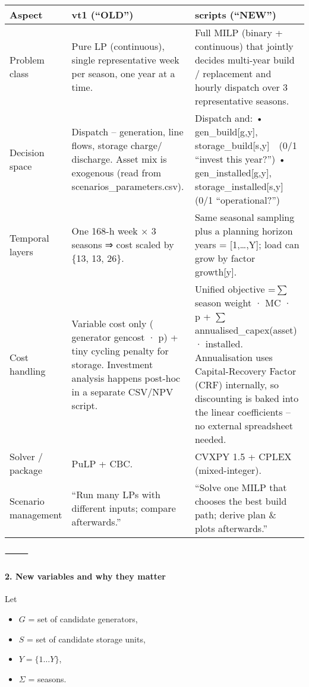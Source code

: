\begin{center}
\begin{tabular}{|l|l|l|}
\hline
Aspect & vt1 (“OLD”) & scripts (“NEW”) \\
\hline
Problem class & Pure LP (continuous), single representative week per season, one year at a time. & Full MILP (binary + continuous) that jointly decides multi-year build / replacement and hourly dispatch over 3 representative seasons. \\
Decision space & Dispatch – generation, line flows, storage charge/ discharge. Asset mix is exogenous (read from scenarios\_parameters.csv). & Dispatch and: • gen\_build[g,y], storage\_build[s,y] (0/1 “invest this year?”) • gen\_installed[g,y], storage\_installed[s,y] (0/1 “operational?”) \\
Temporal layers & One 168-h week × 3 seasons ⇒ cost scaled by \{13, 13, 26\}. & Same seasonal sampling plus a planning horizon years = [1,…,Y]; load can grow by factor growth[y]. \\
Cost handling & Variable cost only ( generator gencost · p) + tiny cycling penalty for storage. Investment analysis happens post-hoc in a separate CSV/NPV script. & Unified objective =$\sum$ season weight · MC · p  +  $\sum$ annualised\_capex(asset) · installed.  Annualisation uses Capital-Recovery Factor (CRF) internally, so discounting is baked into the linear coefficients – no external spreadsheet needed. \\
Solver / package & PuLP + CBC. & CVXPY 1.5 + CPLEX (mixed-integer). \\
Scenario management & “Run many LPs with different inputs; compare afterwards.” & “Solve one MILP that chooses the best build path; derive plan \& plots afterwards.” \\
\hline
\end{tabular}
\end{center}

⸻

\paragraph{2. New variables and why they matter}

Let
\begin{itemize}
    \item $G$ = set of candidate generators,
    \item $S$ = set of candidate storage units,
    \item $Y = \{1\dots Y\}$,
    \item $\Sigma$ = seasons.
\end{itemize}

